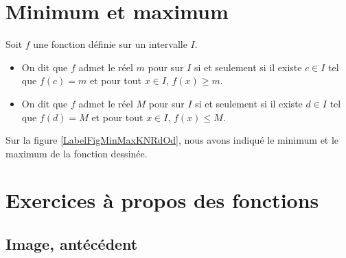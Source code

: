 \section{Minimum et maximum}

\begin{definition}
      Soit $f$ une fonction définie sur un intervalle $I$. \\[-2ex] 
      \begin{itemize}
          \item On dit que $f$ admet le réel $m$ pour 
        sur $I$ si et seulement si il existe $c\in I$ tel que $f(c)=m$
        et pour tout $x\in I$, $f(x)\geq m$. \\[-2ex]
    \item On dit que $f$ admet le réel $M$ pour 
        sur $I$ si et seulement si il existe $d\in I$ tel que $f(d)=M$ et pour tout
        $x\in I$, $f(x)\leq M$.
      \end{itemize}
\end{definition}



Sur la figure \ref{LabelFigMinMaxKNRdOd}, nous avons indiqué le minimum et le maximum de la fonction dessinée.
\newcommand{\CaptionFigMinMaxKNRdOd}{Minimum et maximum d'une fonction.}


\section{Exercices à propos des fonctions}

\subsection{Image, antécédent}



